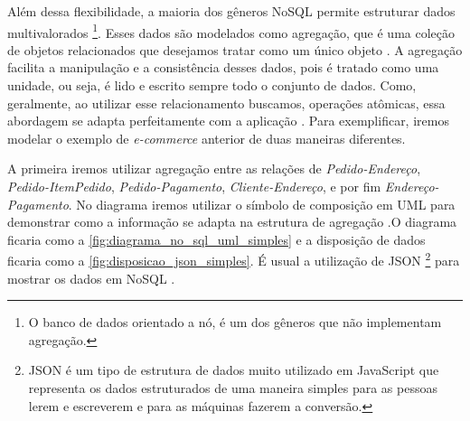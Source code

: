 Além dessa flexibilidade, a maioria dos gêneros NoSQL permite estruturar dados multivalorados \footnote{O banco de dados orientado a nó, é um dos gêneros que não implementam agregação.}. Esses dados são modelados como agregação, que é uma coleção de objetos relacionados que desejamos tratar como um único objeto \cite{domain-driven}. A agregação facilita a manipulação e a consistência desses dados, pois é tratado como uma unidade, ou seja, é lido e escrito sempre todo o conjunto de dados. Como, geralmente, ao utilizar esse relacionamento buscamos, operações atômicas, essa abordagem se adapta perfeitamente com a aplicação \cite{NoSQL}. Para exemplificar, iremos modelar o exemplo de
\textit{e-commerce} anterior de duas maneiras diferentes.

A primeira iremos utilizar agregação entre as relações de \textit{Pedido-Endereço}, \textit{Pedido-ItemPedido}, \textit{Pedido-Pagamento}, \textit{Cliente-Endereço}, e por fim \textit{Endereço-Pagamento}. No diagrama iremos utilizar o símbolo de composição em \ac{UML} para demonstrar como a informação se adapta na estrutura de agregação \cite{NoSQL}.O diagrama ficaria como a \autoref{fig:diagrama_no_sql_uml_simples} e a disposição de dados ficaria como a \autoref{fig:disposicao_json_simples}. É usual a utilização de JSON \footnote{JSON é um tipo de estrutura de dados muito utilizado em JavaScript que representa os dados estruturados de uma maneira simples para as pessoas lerem e escreverem e para as máquinas fazerem a conversão.} para mostrar os dados em NoSQL \cite{NoSQL}.

